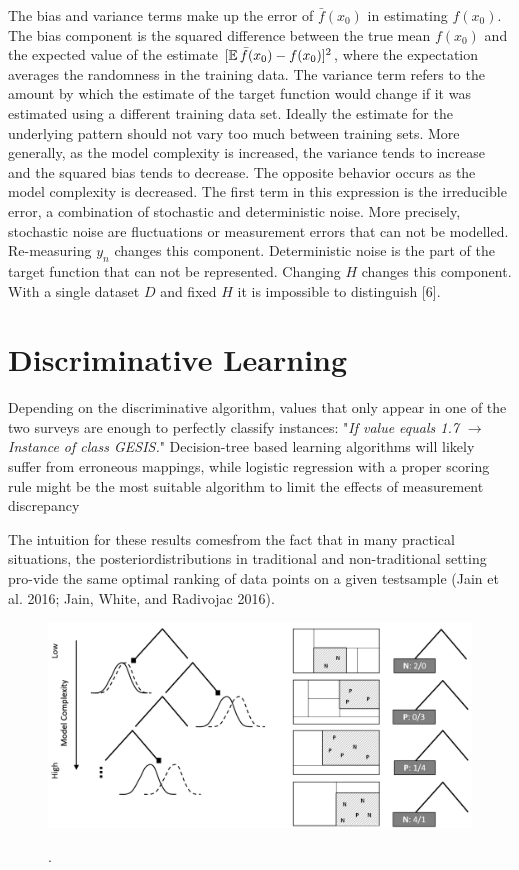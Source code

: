 The bias and variance terms make up the error of \(\bar{f}(x_0)\) in estimating \(f(x_0)\). The bias component is the squared difference between the true mean \(f(x_0)\) and the expected value of the estimate \([\operatorname{\mathbb{E}}\bar{f}(x_0) - f(x_0)]^2\), where the expectation averages the randomness in the training data. The variance term refers to the amount by which the estimate of the target function would change if it was estimated using a different training data set. Ideally the estimate for the underlying pattern should not vary too much between training sets. More generally, as the model complexity is increased, the variance tends to increase and the squared bias tends to decrease. The opposite behavior occurs as the model complexity is decreased. The first term in this expression is the irreducible error, a combination of stochastic and deterministic noise. More precisely, stochastic noise are fluctuations or measurement errors that can not be modelled. Re-measuring \(y_n\) changes this component. Deterministic noise is the part of the target function that can not be represented. Changing \(H\) changes this component. With a single dataset \(D\) and fixed \(H\) it is impossible to distinguish [6].  

\section{Discriminative Learning}

Depending on the discriminative algorithm, values ​​that only appear in one of the two surveys are enough to perfectly classify instances: "\textit{If value equals 1.7  \(\rightarrow\) Instance of class GESIS.}" Decision-tree based learning algorithms will likely suffer from erroneous mappings, while logistic regression with a proper scoring rule might be the most suitable algorithm to limit the effects of measurement discrepancy

The intuition for these results comesfrom the fact that in many practical situations, the posteriordistributions in traditional and non-traditional setting pro-vide the same optimal ranking of data points on a given testsample (Jain et al. 2016; Jain, White, and Radivojac 2016).

\begin{figure}[ht]
	\begin{center}
		\includegraphics[scale=0.40,angle=0]{fig/tree3}
		\label{project}
		\caption{.}
	\end{center}
\end{figure}

